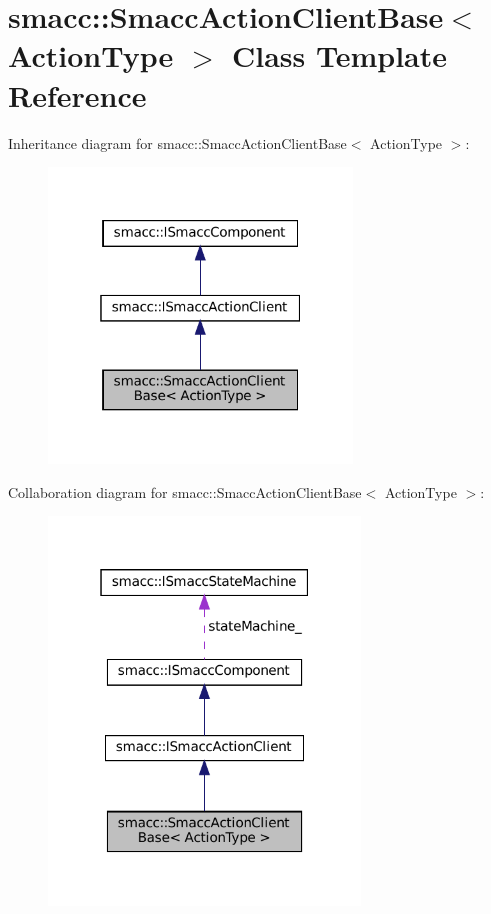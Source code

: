\hypertarget{classsmacc_1_1SmaccActionClientBase}{}\section{smacc\+:\+:Smacc\+Action\+Client\+Base$<$ Action\+Type $>$ Class Template Reference}
\label{classsmacc_1_1SmaccActionClientBase}


Inheritance diagram for smacc\+:\+:Smacc\+Action\+Client\+Base$<$ Action\+Type $>$\+:
\nopagebreak
\begin{figure}[H]
\begin{center}
\leavevmode
\includegraphics[width=229pt]{classsmacc_1_1SmaccActionClientBase__inherit__graph}
\end{center}
\end{figure}


Collaboration diagram for smacc\+:\+:Smacc\+Action\+Client\+Base$<$ Action\+Type $>$\+:
\nopagebreak
\begin{figure}[H]
\begin{center}
\leavevmode
\includegraphics[width=235pt]{classsmacc_1_1SmaccActionClientBase__coll__graph}
\end{center}
\end{figure}
